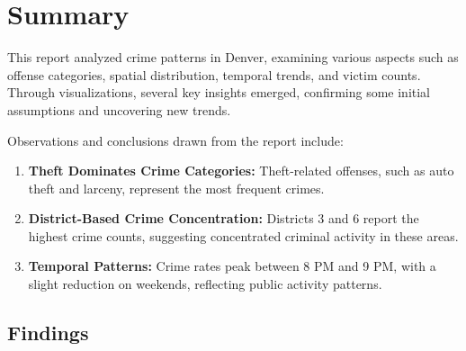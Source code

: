 \documentclass{article}
\begin{document}
\newpage

\section{Summary}
\label{sec:summary}

This report analyzed crime patterns in Denver, examining various aspects such as offense categories, spatial distribution, temporal trends, and victim counts. Through visualizations, several key insights emerged, confirming some initial assumptions and uncovering new trends.

Observations and conclusions drawn from the report include:
\begin{enumerate}
    \item \textbf{Theft Dominates Crime Categories:} Theft-related offenses, such as auto theft and larceny, represent the most frequent crimes.
    \item \textbf{District-Based Crime Concentration:} Districts 3 and 6 report the highest crime counts, suggesting concentrated criminal activity in these areas.
    \item \textbf{Temporal Patterns:} Crime rates peak between 8 PM and 9 PM, with a slight reduction on weekends, reflecting public activity patterns.
\end{enumerate}

\subsection{Findings}
\end{document}
